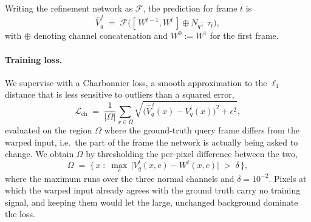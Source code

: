 Writing the refinement network as $\mathcal{F}$, the prediction for frame $t$ is
\begin{equation}
  \hat{V}_q^{\,t} \;=\; \mathcal{F}\bigl( [\,W^{t-1}, W^{t}\,] \oplus N_q ; \; \tau_t \bigr),
  \label{eq:refine}
\end{equation}
with $\oplus$ denoting channel concatenation and $W^{0} := W^{1}$ for the first frame.

\paragraph{Training loss.}
We supervise with a Charbonnier loss, a smooth approximation to the $\ell_1$ distance that is less
sensitive to outliers than a squared error,
\begin{equation}
  \mathcal{L}_{\mathrm{ch}} \;=\;
  \frac{1}{|\Omega|}\sum_{x \in \Omega}
  \sqrt{\bigl(\hat{V}_q^{\,t}(x) - V_q^{t}(x)\bigr)^2 + \epsilon^2},
\end{equation}
evaluated on the region $\Omega$ where the ground-truth query frame differs from the warped input,
i.e.\ the part of the frame the network is actually being asked to change. We obtain $\Omega$ by
thresholding the per-pixel difference between the two,
\begin{equation}
  \Omega \;=\; \bigl\{\, x \;:\; \max_{c} \, \bigl\lvert V_q^{t}(x, c) - W^{t}(x, c) \bigr\rvert
  \;>\; \delta \,\bigr\},
  \label{eq:lossmask}
\end{equation}
where the maximum runs over the three normal channels and $\delta = 10^{-2}$. Pixels at which the warped input already agrees with the ground truth carry no training
signal, and keeping them would let the large, unchanged background dominate the loss.
